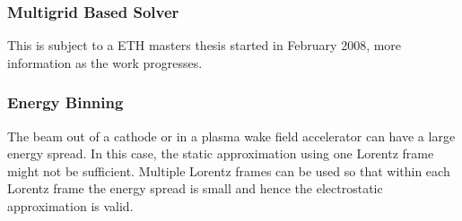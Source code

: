 
\subsubsection{Multigrid Based Solver}
This is subject to a ETH masters thesis started in February 2008, more information as the work
progresses.
\subsubsection{Energy Binning}
The beam out of a cathode or in a plasma wake field accelerator can have a large energy spread.
In this case, the static approximation using one Lorentz frame might not be sufficient. Multiple
Lorentz frames  can be used so that within each Lorentz frame the energy
spread is small and hence the electrostatic approximation is valid. 
 \latermore


